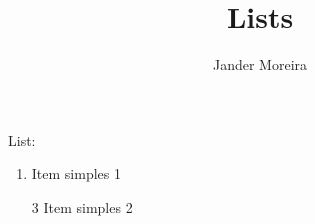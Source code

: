 \documentclass[10pt]{beamer}
\title{Lists}
\author{Jander Moreira}
\begin{document}
\maketitle

\begin{frame}
    List:

    \begin{enumerate}[<+->]
        \item Item simples 1
        \item [3]Item simples 2
    \end{enumerate}

\end{frame}
\end{document}
